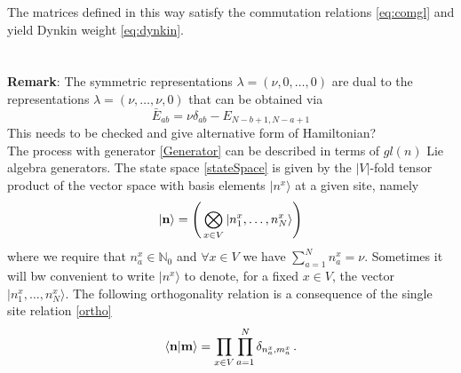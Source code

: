 \documentclass[10pt]{article}
\numberwithin{equation}{section}
\numberwithin{equation}{subsection}
\newcommand{\twoj}{\nu}
\begin{document}
The matrices defined in this way satisfy the commutation relations \eqref{eq:comgl} and yield Dynkin weight \eqref{eq:dynkin}. \\
\\ \\
\textbf{Remark}: The symmetric representations $\lambda=(\twoj,0,\ldots,0)$ are dual to the representations $\lambda=(\twoj,\ldots,\twoj,0)$ that can be obtained via 
\begin{equation}
   \bar E_{ab}=\nu\delta_{ab}-E_{N-b+1,N-a+1}
\end{equation}
{\color{red} This needs to be checked and give alternative form of Hamiltonian?}\\
The process with generator \eqref{Generator} can be described in terms of $gl(n)$ Lie algebra generators. The state space \eqref{stateSpace} is given by the $|V|$-fold tensor product of the vector space with basis elements $|n^x\rangle$ at a given site, namely
\begin{equation}
|{\bf n}\rangle=\left(\,\bigotimes_{x\in V}	|n_{1}^{x},\ldots,n_{N}^{x}\rangle\right)
\end{equation}
where we require that $n_{a}^{x}\in \mathbb{N}_{0}$ and $\forall x\in V$ we have $\sum_{a=1}^{N}n_{a}^{x}=\nu$. Sometimes it will bw convenient to write $|n^{x}\rangle$ to denote, for a fixed $x\in V$, the vector $|n_{1}^{x},\ldots,n_{N}^{x}\rangle$.
The following orthogonality relation is a consequence of the single site relation \eqref{ortho}
\begin{equation}
    \langle {\bf n}|{\bf m}\rangle =\prod_{x\in V}\prod_{a=1}^N\delta_{n^x_a,m^{x}_a}\,.
\end{equation}
\end{document}
